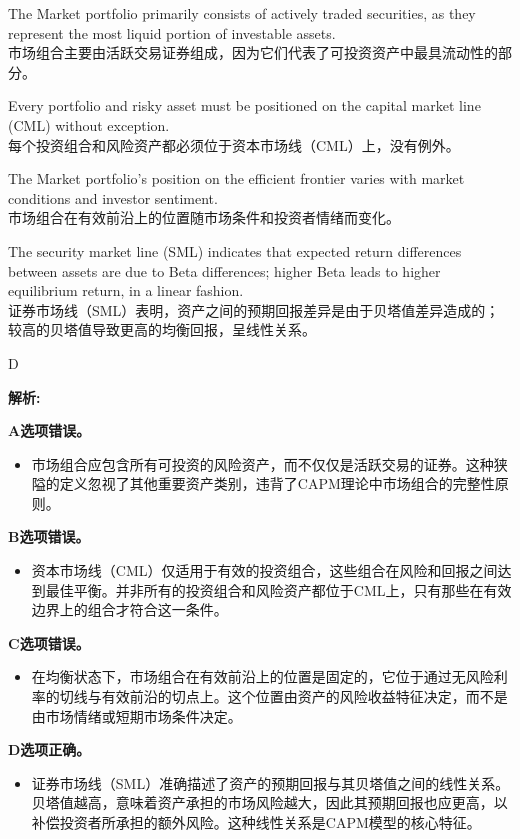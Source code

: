 \documentclass{article}
\newenvironment{explanation}
{\textbf{解析:}\par}
{\par}
\begin{document}
\begin{choices}
    \item The Market portfolio primarily consists of actively traded securities, as they represent the most liquid portion of investable assets.
    \\
    市场组合主要由活跃交易证券组成，因为它们代表了可投资资产中最具流动性的部分。
    \item Every portfolio and risky asset must be positioned on the capital market line (CML) without exception.
    \\
    每个投资组合和风险资产都必须位于资本市场线（CML）上，没有例外。
    \item The Market portfolio's position on the efficient frontier varies with market conditions and investor sentiment.
    \\
    市场组合在有效前沿上的位置随市场条件和投资者情绪而变化。
    \item The security market line (SML) indicates that expected return differences between assets are due to Beta differences; higher Beta leads to higher equilibrium return, in a linear fashion.
    \\
    证券市场线（SML）表明，资产之间的预期回报差异是由于贝塔值差异造成的；较高的贝塔值导致更高的均衡回报，呈线性关系。
\end{choices}

\begin{correctanswer}
    D
\end{correctanswer}

\begin{explanation}
    \textbf{A选项错误。}
    \begin{itemize}
        \item 市场组合应包含所有可投资的风险资产，而不仅仅是活跃交易的证券。这种狭隘的定义忽视了其他重要资产类别，违背了CAPM理论中市场组合的完整性原则。
    \end{itemize}

    \textbf{B选项错误。}
    \begin{itemize}
        \item 资本市场线（CML）仅适用于有效的投资组合，这些组合在风险和回报之间达到最佳平衡。并非所有的投资组合和风险资产都位于CML上，只有那些在有效边界上的组合才符合这一条件。
    \end{itemize}

    \textbf{C选项错误。}
    \begin{itemize}
        \item 在均衡状态下，市场组合在有效前沿上的位置是固定的，它位于通过无风险利率的切线与有效前沿的切点上。这个位置由资产的风险收益特征决定，而不是由市场情绪或短期市场条件决定。
    \end{itemize}

    \textbf{D选项正确。}
    \begin{itemize}
        \item 证券市场线（SML）准确描述了资产的预期回报与其贝塔值之间的线性关系。贝塔值越高，意味着资产承担的市场风险越大，因此其预期回报也应更高，以补偿投资者所承担的额外风险。这种线性关系是CAPM模型的核心特征。
    \end{itemize}
\end{explanation}
\end{document}
